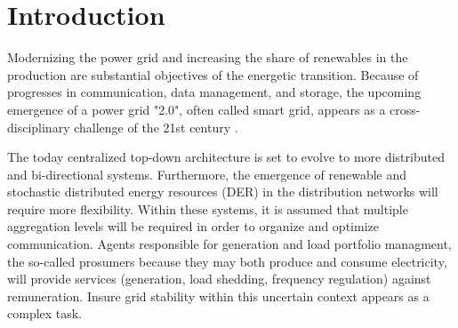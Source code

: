 \documentclass[conference]{IEEEtran}
\begin{document}
\IEEEpeerreviewmaketitle


\section{Introduction}
\label{sec:introduction}

Modernizing the power grid and increasing the share of renewables in the production are substantial objectives of the energetic transition. Because of progresses in communication, data management, and storage, the upcoming emergence of a power grid "2.0", often called smart grid, appears as a cross-disciplinary challenge of the 21st century \cite{Ramchurn}.

The today centralized top-down architecture is set to evolve to more distributed and bi-directional systems. Furthermore, the emergence of renewable and stochastic distributed energy resources (DER) in the distribution networks will require more flexibility. Within these systems, it is assumed that multiple aggregation levels will be required in order to organize and optimize communication. Agents responsible for generation and load portfolio managment, the so-called prosumers \cite{Parag2016} because they may both produce and consume electricity, will provide services (generation, load shedding, frequency regulation) against remuneration. Insure grid stability within this uncertain context appears as a complex task. 

\end{document}
